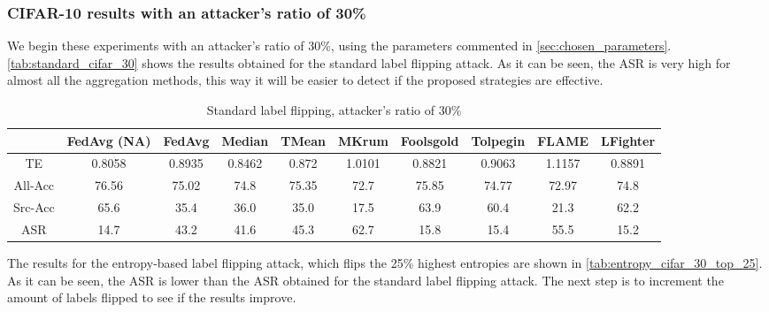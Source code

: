 \subsubsection{CIFAR-10 results with an attacker's ratio of 30\%}\label{sec:cifar_30}
We begin these experiments with an attacker's ratio of 30\%, using the parameters commented in \ref{sec:chosen_parameters}.
\autoref{tab:standard_cifar_30} shows the results obtained for the standard label flipping attack.
As it can be seen, the ASR is very high for almost all the aggregation methods, this way it will be easier to detect if the proposed strategies are effective.

\begin{table}[h!]
        \centering
        \small
        \begin{adjustbox}{center}
        \begin{tabular}{|c|c|c|c|c|c|c|c|c|c|}
            \hline
            & FedAvg (NA) & FedAvg & Median & TMean & MKrum & Foolsgold & Tolpegin & FLAME & LFighter \\
            \hline
            TE & 0.8058 & 0.8935 & 0.8462 & 0.872 & 1.0101 & 0.8821 & 0.9063 & 1.1157 & 0.8891 \\
            \hline
            All-Acc & 76.56 & 75.02 & 74.8 & 75.35 & 72.7 & 75.85 & 74.77 & 72.97 & 74.8 \\
            \hline
            Src-Acc & 65.6 & 35.4 & 36.0 & 35.0 & 17.5 & 63.9 & 60.4 & 21.3 & 62.2 \\
            \hline
            ASR & 14.7 & 43.2 & 41.6 & 45.3 & 62.7 & 15.8 & 15.4 & 55.5 & 15.2 \\
            \hline
        \end{tabular}
        \end{adjustbox}
        \caption{Standard label flipping, attacker's ratio of 30\%}
        \label{tab:standard_cifar_30}
\end{table}

The results for the entropy-based label flipping attack, which flips the 25\% highest entropies are shown in \autoref{tab:entropy_cifar_30_top_25}.
As it can be seen, the ASR is lower than the ASR obtained for the standard label flipping attack. The next step is to increment the amount of labels flipped to see if the results improve.

